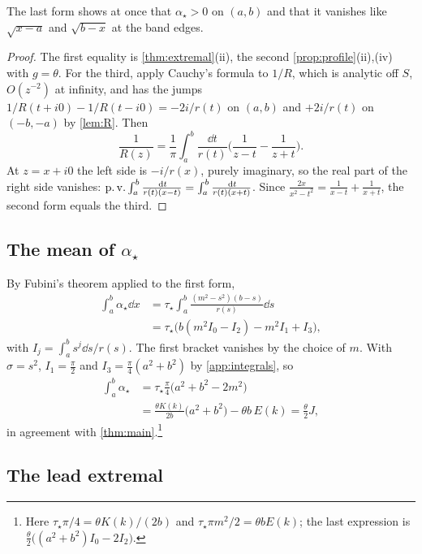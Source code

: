 The last form shows at once that $\alpha_\star>0$ on $(a,b)$ and that it
vanishes like $\sqrt{x-a}$ and $\sqrt{b-x}$ at the band edges.

\begin{proof}
The first equality is \cref{thm:extremal}(ii), the second
\cref{prop:profile}(ii),(iv) with $g=\theta$. For the third, apply Cauchy's
formula to $1/R$, which is analytic off $S$, $O(z^{-2})$ at infinity, and
has the jumps $1/R(t+i0)-1/R(t-i0)=-2i/r(t)$ on $(a,b)$ and $+2i/r(t)$ on
$(-b,-a)$ by \cref{lem:R}. Then
\[
\frac1{R(z)}=\frac1\pi\int_a^b\frac{\dd t}{r(t)}\Big(\frac1{z-t}-\frac1{z+t}\Big).
\]
At $z=x+i0$ the left side is $-i/r(x)$, purely imaginary, so the real part
of the right side vanishes:
$\operatorname{p.v.}\int_a^b\frac{\,\mathrm d t}{r(t)(x-t)}=\int_a^b\frac{\,\mathrm d t}{r(t)(x+t)}$. Since
$\frac{2x}{x^2-t^2}=\frac1{x-t}+\frac1{x+t}$, the second form equals the
third.
\end{proof}

\subsection{The mean of $\alpha_\star$}

By Fubini's theorem applied to the first form,
\begin{align*}
\int_a^b\alpha_\star\dd x&=\tau_\star\int_a^b\frac{(m^2-s^2)(b-s)}{r(s)}\dd s\\
&=\tau_\star\big(b(m^2I_0-I_2)-m^2I_1+I_3\big),
\end{align*}
with $I_j=\int_a^bs^j\dd s/r(s)$. The first bracket vanishes by the choice of
$m$. With $\sigma=s^2$, $I_1=\frac\pi2$ and $I_3=\frac\pi4(a^2+b^2)$ by
\cref{app:integrals}, so
\begin{align*}
\int_a^b\alpha_\star&=\tau_\star\frac\pi4\big(a^2+b^2-2m^2\big)\\
&=\frac{\theta K(k)}{2b}\big(a^2+b^2\big)-\theta b\,E(k)
=\frac\theta2J,
\end{align*}
in agreement with \cref{thm:main}.\footnote{Here
$\tau_\star\pi/4=\theta K(k)/(2b)$ and $\tau_\star\pi m^2/2=\theta bE(k)$; the
last expression is $\frac\theta2\big((a^2+b^2)I_0-2I_2\big)$.}

\subsection{The lead extremal}

